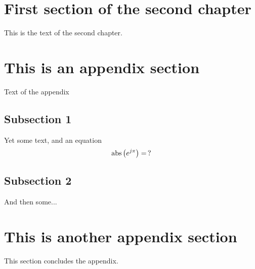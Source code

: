 \section{First section of the second chapter}
This is the text of the second chapter. \cite{*}

\appendix
\section{This is an appendix section}
Text of the appendix

\subsection{Subsection 1}
Yet some text, and an equation
\begin{equation}
    \textnormal{abs}\left(e^{j\pi}\right)=\,?
\end{equation}

\subsection{Subsection 2}
And then some...

\section{This is another appendix section}
This section concludes the appendix.
